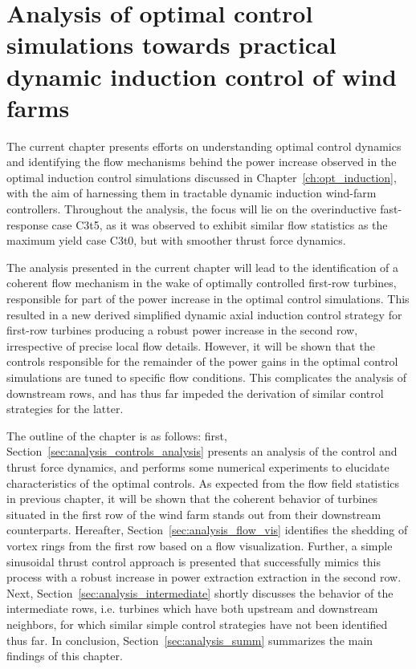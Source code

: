 \chapter{Analysis of optimal control simulations towards practical dynamic induction control of wind farms}\label{ch:opt_analysis}

The current chapter presents efforts on understanding optimal control dynamics and identifying the flow mechanisms behind the power increase observed in the optimal induction control simulations discussed in Chapter~\ref{ch:opt_induction}, with the aim of harnessing them in tractable dynamic induction wind-farm controllers. Throughout the analysis, the focus will lie on the overinductive fast-response case C3t5, as it was observed to exhibit similar flow statistics as the maximum yield case C3t0, but with smoother thrust force dynamics.

The analysis presented in the current chapter will lead to the identification of a coherent flow mechanism in the wake of optimally controlled first-row turbines, responsible for part of the power increase in the optimal control simulations. This resulted in a new derived simplified dynamic axial induction control strategy for first-row turbines producing a robust power increase in the second row, irrespective of precise local flow details. However, it will be shown that the controls responsible for the remainder of the power gains in the optimal control simulations are tuned to specific flow conditions. This complicates the analysis of downstream rows, and has thus far impeded the derivation of similar control strategies for the latter.

The outline of the chapter is as follows: first, Section~\ref{sec:analysis_controls_analysis} presents an analysis of the control and thrust force dynamics, and performs some numerical experiments to elucidate characteristics of the optimal controls. As expected from the flow field statistics in previous chapter, it will be shown that the coherent behavior of turbines situated in the first row of the wind farm stands out from their downstream counterparts. Hereafter, Section~\ref{sec:analysis_flow_vis} identifies the shedding of vortex rings from the first row based on a flow visualization. Further, a simple sinusoidal thrust control approach is presented that successfully mimics this process with a robust increase in power extraction extraction in the second row. Next, Section~\ref{sec:analysis_intermediate} shortly discusses the behavior of the intermediate rows, i.e. turbines which have both upstream and downstream neighbors, for which similar simple control strategies have not been identified thus far. In conclusion, Section~\ref{sec:analysis_summ} summarizes the main findings of this chapter.

